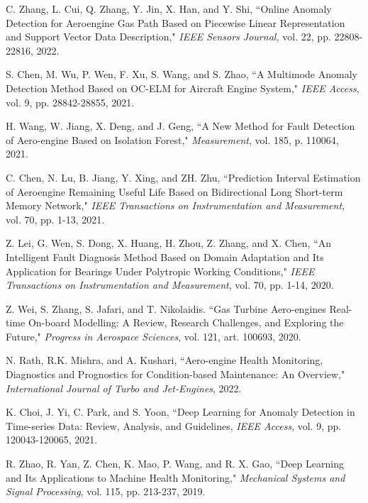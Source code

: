 \documentclass[journal]{IEEEtran}
\begin{document}
\begin{thebibliography}{00}

 C. Zhang, L. Cui, Q. Zhang, Y. Jin, X. Han, and Y. Shi, ``Online Anomaly Detection for Aeroengine Gas Path Based on Piecewise Linear Representation and Support Vector Data Description," \textit{IEEE Sensors Journal,} vol. 22, pp. 22808-22816, 2022.

 S. Chen, M. Wu, P. Wen, F. Xu, S. Wang, and S. Zhao, ``A Multimode Anomaly Detection Method Based on OC-ELM for Aircraft Engine System," \textit{IEEE Access}, vol. 9, pp. 28842-28855, 2021.


 H. Wang, W. Jiang, X. Deng, and J. Geng, ``A New Method for Fault Detection of Aero-engine Based on Isolation Forest,"\textit{ Measurement}, vol. 185, p. 110064, 2021.

 C. Chen, N. Lu, B. Jiang, Y. Xing, and ZH. Zhu, ``Prediction Interval Estimation of Aeroengine Remaining Useful Life Based on Bidirectional Long Short-term Memory Network," \textit{IEEE Transactions on Instrumentation and Measurement,} vol. 70, pp. 1-13, 2021.


 Z. Lei, G. Wen, S. Dong, X. Huang, H. Zhou, Z. Zhang, and X. Chen, ``An Intelligent Fault Diagnosis Method Based on Domain Adaptation and Its Application for Bearings Under Polytropic Working Conditions," \textit{IEEE Transactions on Instrumentation and Measurement}, vol. 70, pp. 1-14, 2020.

 Z. Wei, S. Zhang, S. Jafari, and T. Nikolaidis. ``Gas Turbine Aero-engines Real-time On-board Modelling: A Review, Research Challenges, and Exploring the Future," \textit{Progress in Aerospace Sciences}, vol. 121, art. 100693, 2020.

 N. Rath, R.K. Mishra, and A. Kushari, ``Aero-engine Health Monitoring, Diagnostics and Prognostics for Condition-based Maintenance: An Overview," \textit{International Journal of Turbo and Jet-Engines}, 2022.

 K. Choi, J. Yi, C. Park, and S. Yoon, ``Deep Learning for Anomaly Detection in Time-series Data: Review, Analysis, and Guidelines, \textit{IEEE Access}, vol. 9, pp. 120043-120065, 2021.

 R. Zhao, R. Yan, Z. Chen, K. Mao, P. Wang, and R. X. Gao, ``Deep Learning and Its Applications to Machine Health Monitoring," \textit{Mechanical Systems and Signal Processing}, vol. 115, pp. 213-237, 2019.


\end{thebibliography}
\end{document}
